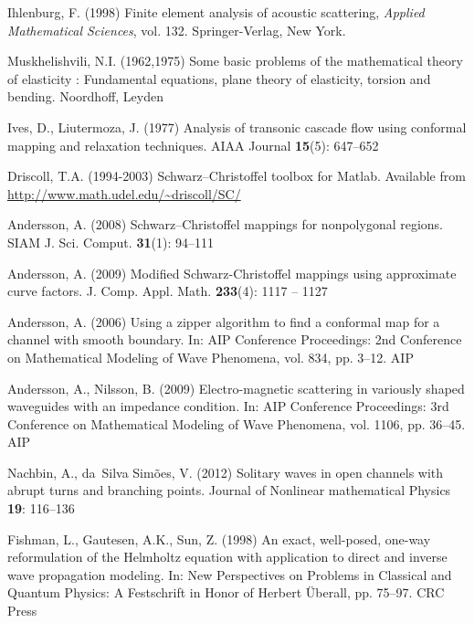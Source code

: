 \documentclass{svjour3}
\begin{document}
\begin{thebibliography}{10}
Ihlenburg, F. (1998) Finite element analysis of acoustic scattering,
  \emph{Applied Mathematical Sciences}, vol. 132.
\newblock Springer-Verlag, New York.
\newblock {}

Muskhelishvili, N.I. (1962,1975) Some basic problems of the mathematical
  theory of elasticity : {F}undamental equations, plane theory of elasticity,
  torsion and bending.
\newblock Noordhoff, Leyden

Ives, D., Liutermoza, J. (1977) Analysis of transonic cascade flow using
  conformal mapping and relaxation techniques.
\newblock AIAA Journal \textbf{15}(5): 647--652

Driscoll, T.A. (1994-2003) Schwarz--{C}hristoffel {t}oolbox for {M}atlab.
\newblock Available from \url{http://www.math.udel.edu/~driscoll/SC/}


Andersson, A. (2008) Schwarz--{C}hristoffel mappings for nonpolygonal regions.
\newblock SIAM J. Sci. Comput. \textbf{31}(1): 94--111

Andersson, A. (2009) Modified {S}chwarz-{C}hristoffel mappings using
  approximate curve factors.
\newblock J. Comp. Appl. Math. \textbf{233}(4): 1117 -- 1127

Andersson, A. (2006) Using a zipper algorithm to find a conformal map for a channel with smooth boundary.
\newblock In: AIP Conference Proceedings: 2nd Conference on Mathematical
  Modeling of Wave Phenomena, vol. 834, pp. 3--12. AIP 

Andersson, A., Nilsson, B. (2009) Electro-magnetic scattering in variously shaped waveguides with an impedance condition.
\newblock In: AIP Conference Proceedings: 3rd Conference on Mathematical
  Modeling of Wave Phenomena, vol. 1106, pp. 36--45. AIP

Nachbin, A., da~Silva Sim\~oes, V. (2012) Solitary waves in open channels with
  abrupt turns and branching points.
\newblock Journal of Nonlinear mathematical Physics \textbf{19}: 116--136

Fishman, L., Gautesen, A.K., Sun, Z. (1998) An exact, well-posed, one-way
  reformulation of the {H}elmholtz equation with application to direct and
  inverse wave propagation modeling.
\newblock In: New Perspectives on Problems in Classical and Quantum Physics: A
  Festschrift in Honor of Herbert \"Uberall, pp. 75--97. CRC Press


\end{thebibliography}
\end{document}
